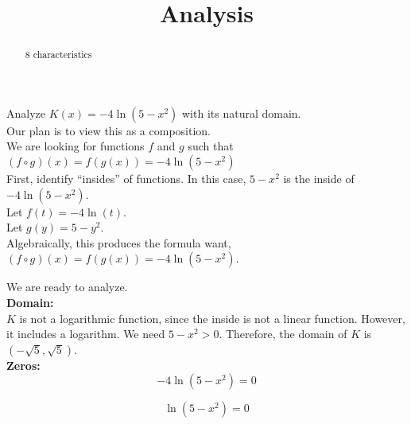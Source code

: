 \documentclass{ximera}
\title{Analysis}
\begin{document}
\begin{abstract}
8 characteristics
\end{abstract}
\maketitle












Analyze $K(x) = -4 \ln(5 - x^2)$ with its natural domain. \\

Our plan is to view this as a composition. \\






We are looking for functions $f$ and $g$ such that $(f \circ g)(x) = f(g(x)) = -4 \ln(5 - x^2)$ \\


First, identify ``insides'' of functions.  In this case, $5 - x^2$ is the inside of $-4 \ln(5 - x^2)$. \\




Let $f(t) = -4 \ln(t)$. \\

Let $g(y) = 5 - y^2$. \\


Algebraically, this produces the formula want, $(f \circ g)(x) = f(g(x)) = -4 \ln(5 - x^2)$.



We are ready to analyze. \\




\textbf{\textcolor{blue!55!black}{Domain:}} \\


$K$ is not a logarithmic function, since the inside is not a linear function.  However, it includes a logarithm. We need $5 - x^2 > 0$.  Therefore, the domain of $K$ is $(-\sqrt{5}, \sqrt{5})$. \\



\textbf{\textcolor{blue!55!black}{Zeros:}} \\




\[
-4 \ln(5 - x^2) = 0
\]


\[
 \ln(5 - x^2) = 0
\]
\end{document}
